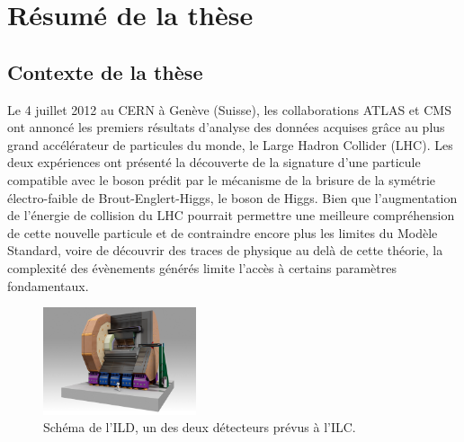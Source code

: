 \chapter{Résumé de la thèse}

  \section{Contexte de la thèse}

  Le 4 juillet 2012 au CERN à Genève (Suisse), les collaborations ATLAS et CMS ont annoncé les premiers résultats d'analyse des données acquises grâce au plus grand accélérateur de particules du monde, le Large Hadron Collider (LHC)\cite{Aad2012}\cite{Chatrchyan2012}. 
  Les deux expériences ont présenté la découverte de la signature d'une particule compatible avec le boson prédit par le mécanisme de la brisure de la symétrie électro-faible de Brout-Englert-Higgs, le boson de Higgs.
  Bien que l'augmentation de l'énergie de collision du LHC pourrait permettre une meilleure compréhension de cette nouvelle particule et de contraindre encore plus les limites du Modèle Standard, voire de découvrir des traces de physique au delà de cette théorie, la complexité des évènements générés limite l'accès à certains paramètres fondamentaux.
  
  \begin{figure}[!h]
    \centering
    \includegraphics[width = 0.4\textwidth]{Pictures/ILC/ILD.jpg}
    \caption{Schéma de l'ILD, un des deux détecteurs prévus à l'ILC.}
    \label{fig:ILD_resume}
  \end{figure}
 
